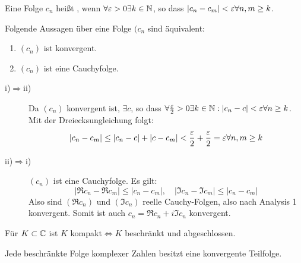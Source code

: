 \begin{definition}
Eine Folge $ c_n $ hei\ss t , wenn $ \forall\varepsilon>0\exists k\in\mathbb{N} $, so dass $ |c_n-c_m|<\varepsilon\forall n,m\geq k $.
\end{definition}
\begin{satz}
Folgende Aussagen \"uber eine Folge $ (c_n $ sind \"aquivalent:
\begin{enumerate}
\item $ (c_n) $ ist konvergent.
\item $ (c_n) $ ist eine Cauchyfolge.
\end{enumerate}
\end{satz}
\begin{beweis}
\begin{description}
\item[i)$ \Rightarrow $ii)] Da $ (c_n) $ konvergent ist, $ \exists c $, so dass $ \forall\frac{\varepsilon}{2}>0\exists k\in\mathbb{N}:|c_n-c|<\varepsilon\forall n\geq k $. Mit der Dreiecksungleichung folgt:
\[ |c_n-c_m|\leq|c_n-c|+|c-c_m|<\frac{\varepsilon}{2}+\frac{\varepsilon}{2}=\varepsilon\forall n,m\geq k \]
\item[ii)$ \Rightarrow $i)] $ (c_n) $ ist eine Cauchyfolge. Es gilt:
\[ |\Re c_n-\Re c_m|\leq|c_n-c_m|,\quad |\Im c_n-\Im c_m|\leq|c_n-c_m| \]
Also sind $ (\Re c_n) $ und $ (\Im c_n) $ reelle Cauchy-Folgen, also nach Analysis 1 konvergent. Somit ist auch $ c_n=\Re c_n+i\Im c_n $ konvergent.
\end{description}
\end{beweis}
\begin{satz}
F\"ur $ K\subset\mathbb{C} $ ist $ K $ kompakt$ \Leftrightarrow K$ beschr\"ankt und abgeschlossen.
\end{satz}
\begin{satz}
Jede beschr\"ankte Folge komplexer Zahlen besitzt eine konvergente Teilfolge.
\end{satz}